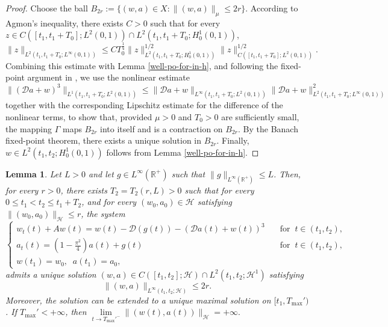 \documentclass[a4paper]{article}
\newtheorem{lemma}[theorem]{Lemma}
\numberwithin{equation}{section}
\begin{document}
\begin{appendices}
\begin{proof}
 Choose the ball $B_{2r}:=\{(w,a)\in X:\|(w,a)\|_{\mu}\le 2r\}$. According to Agmon's inequality, there exists $C>0$ such that for every $z\in C([t_1,t_1+T_0];L^2(0,1))\cap L^2(t_1,t_1+T_0;H^1_0(0,1))$,
 \begin{equation*}
    \|z\|_{L^2(t_1,t_1+T_0;L^{\infty}(0,1))}\le CT_0^{\frac{1}{4}}\|z\|^{1/2}_{L^2(t_1,t_1+T_0;H^1_0(0,1))}\|z\|^{1/2}_{C([t_1,t_1+T_0];L^2(0,1))}.
\end{equation*}
Combining this estimate with Lemma \ref{well-po-for-in-h}, and following the fixed-point argument in \cite{CX}, we use the nonlinear estimate
\begin{equation}\label{f-est-69}\|(\mathcal{D}a+w)^3\|_{L^1(t_1,t_1+T_0;L^{2}(0,1))}\le \|\mathcal{D}a+w\|_{L^{\infty}(t_1,t_1+T_0;L^2(0,1))}\|\mathcal{D}a+w\|_{L^2(t_1,t_1+T_0;L^{\infty}(0,1))}^2\end{equation}
together with the corresponding Lipschitz estimate for the difference of the nonlinear terms, to show that, provided $\mu>0$ and $T_0>0$ are sufficiently small, the mapping $\Gamma$ maps $B_{2r}$ into itself and is a contraction on $B_{2r}$. By the Banach fixed-point theorem, there exists a unique solution in $B_{2r}$. Finally, $w\in L^2(t_1,t_2;H^1_0(0,1))$ follows from Lemma \ref{well-po-for-in-h}.
\end{proof}
\begin{lemma}\label{w1}
Let $L>0$ and let $g\in L^{\infty}(\mathbb{R}^+) $ such that $\|g\|_{ L^{\infty}(\mathbb{R}^+) }\le L$. Then, for every $r>0$, there exists $T_2=T_2\left(r,L\right)>0$ such that for every $0\le t_1<t_2\le t_1+T_2$, and for every $(w_0,a_0)\in \mathcal{H}$ satisfying $\|(w_0,a_0)\|_{\mathcal{H}}\le r$, the system
\begin{equation}\label{we2}
 \left\{\begin{array}{ll}
    w_t(t)+Aw(t)=w(t)-\mathcal{D}(g(t))-(\mathcal{D}a(t)+w(t))^3\quad&\text{for}\;\;t\in (t_1,t_2),\\
    a_t(t)=(1-\frac{\pi^2}{4})a(t)+g(t)\quad&\text{for}\;\;t\in (t_1,t_2),\\
    w(t_1)=w_0,\;\;a(t_1)=a_0,
\end{array}\right.
\end{equation}
admits a unique solution $(w,a)\in C([t_1,t_2];\mathcal H)\cap L^2(t_1,t_2;\mathcal H^1)$ satisfying
\begin{equation}\label{es2}
\|(w,a)\|_{L^{\infty}(t_1,t_2;\mathcal{H})}\le 2 r.
\end{equation}
Moreover, the solution can be extended to a unique maximal solution on
$[t_1,T_{\max}')$. If $T_{\max}'<+\infty$, then $\lim\limits_{t\to T_{\max}'^-}\|(w(t),a(t))\|_{\mathcal H}=+\infty.$
\end{lemma}


\end{appendices}
\end{document}
